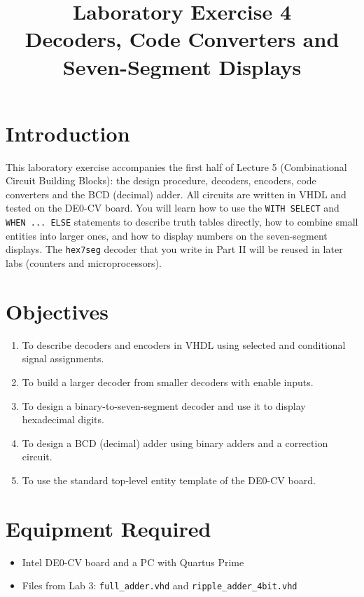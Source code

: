 \documentclass{article}
\title{Laboratory Exercise 4 \\ Decoders, Code Converters and Seven-Segment Displays}
\author{}
\date{}
\begin{document}
\maketitle

\section*{Introduction}
This laboratory exercise accompanies the first half of Lecture 5 (Combinational Circuit Building Blocks): the design procedure, decoders, encoders, code converters and the BCD (decimal) adder. All circuits are written in VHDL and tested on the DE0-CV board. You will learn how to use the \texttt{WITH SELECT} and \texttt{WHEN ... ELSE} statements to describe truth tables directly, how to combine small entities into larger ones, and how to display numbers on the seven-segment displays. The \texttt{hex7seg} decoder that you write in Part II will be reused in later labs (counters and microprocessors).

\section*{Objectives}
\begin{enumerate}
    \item To describe decoders and encoders in VHDL using selected and conditional signal assignments.
    \item To build a larger decoder from smaller decoders with enable inputs.
    \item To design a binary-to-seven-segment decoder and use it to display hexadecimal digits.
    \item To design a BCD (decimal) adder using binary adders and a correction circuit.
    \item To use the standard top-level entity template of the DE0-CV board.
\end{enumerate}

\section*{Equipment Required}
\begin{itemize}
    \item Intel DE0-CV board and a PC with Quartus Prime
    \item Files from Lab 3: \texttt{full\_adder.vhd} and \texttt{ripple\_adder\_4bit.vhd}
\end{itemize}
\end{document}
